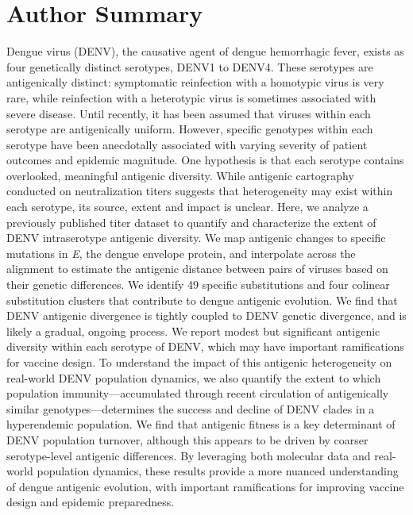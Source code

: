 \documentclass[11pt,oneside,letterpaper]{article}
\begin{document}
\section*{Author Summary}
Dengue virus (DENV), the causative agent of dengue hemorrhagic fever, exists as four genetically distinct serotypes, DENV1 to DENV4.
These serotypes are antigenically distinct: symptomatic reinfection with a homotypic virus is very rare, while reinfection with a heterotypic virus is sometimes associated with severe disease.
Until recently, it has been assumed that viruses within each serotype are antigenically uniform.
However, specific genotypes within each serotype have been anecdotally associated with varying severity of patient outcomes and epidemic magnitude.
One hypothesis is that each serotype contains overlooked, meaningful antigenic diversity.
While antigenic cartography conducted on neutralization titers suggests that heterogeneity may exist within each serotype, its source, extent and impact is unclear.
Here, we analyze a previously published titer dataset to quantify and characterize the extent of DENV intraserotype antigenic diversity.
We map antigenic changes to specific mutations in \textit{E}, the dengue envelope protein, and interpolate across the alignment to estimate the antigenic distance between pairs of viruses based on their genetic differences.
We identify 49 specific substitutions and four colinear substitution clusters that contribute to dengue antigenic evolution.
We find that DENV antigenic divergence is tightly coupled to DENV genetic divergence, and is likely a gradual, ongoing process.
We report modest but significant antigenic diversity within each serotype of DENV, which may have important ramifications for vaccine design.
To understand the impact of this antigenic heterogeneity on real-world DENV population dynamics, we also quantify the extent to which population immunity---accumulated through recent circulation of antigenically similar genotypes---determines the success and decline of DENV clades in a hyperendemic population.
We find that antigenic fitness is a key determinant of DENV population turnover, although this appears to be driven by coarser serotype-level antigenic differences.
By leveraging both molecular data and real-world population dynamics, these results provide a more nuanced understanding of dengue antigenic evolution, with important ramifications for improving vaccine design and epidemic preparedness.

\pagebreak
\end{document}
